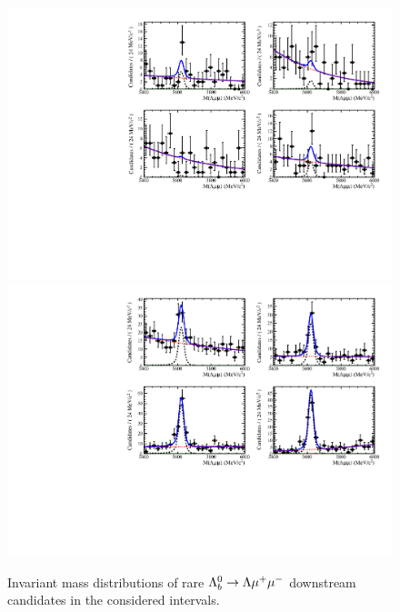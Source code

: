 \begin{figure}
\centering
\includegraphics[width=1.\textwidth]{Lmumu/figs/MassFits/q2_fits_DD_plot2.pdf}
\includegraphics[width=1.\textwidth]{Lmumu/figs/MassFits/q2_fits_DD_plot1.pdf}
\caption{Invariant mass distributions of rare $\Lambda^0_b\rightarrow\Lambda\mu^+\mu^-$ downstream candidates in the considered \qsq intervals.
 }
\label{fig:Lb_differentialFitDD}
\end{figure}

